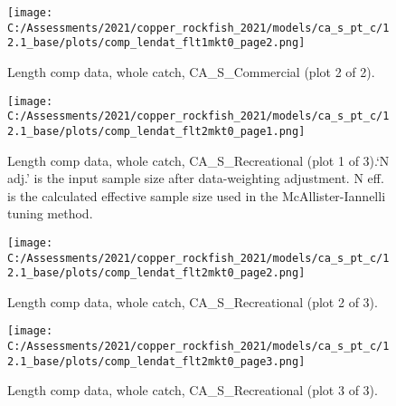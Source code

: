 \documentclass[11pt,
  english,
  a4paper,
]{article}
\begin{document}
\tagmcend\tagstructend


\begin{figure}
\centering
\texttt{[image: C:/Assessments/2021/copper\_rockfish\_2021/models/ca\_s\_pt\_c/12.1\_base/plots/comp\_lendat\_flt1mkt0\_page2.png]}
\caption{Length comp data, whole catch, CA\_S\_Commercial (plot 2 of 2).\label{fig:comp_lendat_flt1mkt0_page2}}
\end{figure}

\tagmcend\tagstructend


\begin{figure}
\centering
\texttt{[image: C:/Assessments/2021/copper\_rockfish\_2021/models/ca\_s\_pt\_c/12.1\_base/plots/comp\_lendat\_flt2mkt0\_page1.png]}
\caption{Length comp data, whole catch, CA\_S\_Recreational (plot 1 of 3).`N adj.' is the input sample size after data-weighting adjustment. N eff. is the calculated effective sample size used in the McAllister-Iannelli tuning method.\label{fig:comp_lendat_flt2mkt0_page1}}
\end{figure}

\tagmcend\tagstructend


\begin{figure}
\centering
\texttt{[image: C:/Assessments/2021/copper\_rockfish\_2021/models/ca\_s\_pt\_c/12.1\_base/plots/comp\_lendat\_flt2mkt0\_page2.png]}
\caption{Length comp data, whole catch, CA\_S\_Recreational (plot 2 of 3).\label{fig:comp_lendat_flt2mkt0_page2}}
\end{figure}

\tagmcend\tagstructend


\begin{figure}
\centering
\texttt{[image: C:/Assessments/2021/copper\_rockfish\_2021/models/ca\_s\_pt\_c/12.1\_base/plots/comp\_lendat\_flt2mkt0\_page3.png]}
\caption{Length comp data, whole catch, CA\_S\_Recreational (plot 3 of 3).\label{fig:comp_lendat_flt2mkt0_page3}}
\end{figure}
\end{document}
